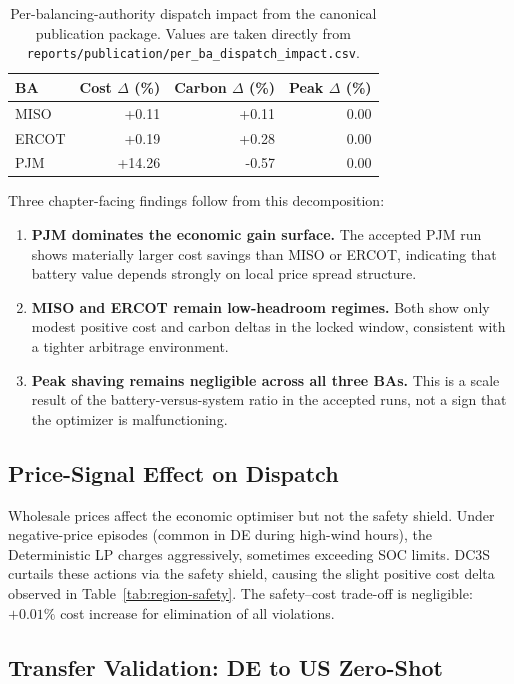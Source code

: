 \begin{table}[ht]
\centering
\caption{Per-balancing-authority dispatch impact from the canonical
  publication package.  Values are taken directly from
  \texttt{reports/publication/per\_ba\_dispatch\_impact.csv}.}
\label{tab:per-ba-impact}
\begin{tabular}{lrrr}
\toprule
\textbf{BA} & \textbf{Cost $\Delta$ (\%)} & \textbf{Carbon $\Delta$ (\%)} &
  \textbf{Peak $\Delta$ (\%)} \\
\midrule
MISO  & +0.11 & +0.11 & 0.00 \\
ERCOT & +0.19 & +0.28 & 0.00 \\
PJM   & +14.26 & -0.57 & 0.00 \\
\bottomrule
\end{tabular}
\end{table}

Three chapter-facing findings follow from this decomposition:
\begin{enumerate}
  \item \textbf{PJM dominates the economic gain surface.}  The accepted PJM
    run shows materially larger cost savings than MISO or ERCOT, indicating
    that battery value depends strongly on local price spread structure.
  \item \textbf{MISO and ERCOT remain low-headroom regimes.}  Both show only
    modest positive cost and carbon deltas in the locked window, consistent
    with a tighter arbitrage environment.
  \item \textbf{Peak shaving remains negligible across all three BAs.}  This
    is a scale result of the battery-versus-system ratio in the accepted runs,
    not a sign that the optimizer is malfunctioning.
\end{enumerate}

\subsection{Price-Signal Effect on Dispatch}

Wholesale prices affect the economic optimiser but not the safety
shield.  Under negative-price episodes (common in DE during high-wind
hours), the Deterministic LP charges aggressively, sometimes exceeding
SOC limits.  DC3S curtails these actions via the safety shield, causing
the slight positive cost delta observed in Table~\ref{tab:region-safety}.
The safety--cost trade-off is negligible: $+0.01\%$ cost increase for
elimination of all violations.

\subsection{Transfer Validation: DE to US Zero-Shot}

